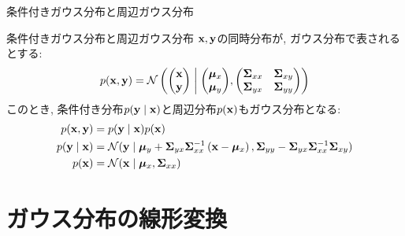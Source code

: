 \documentclass[dvipdfmx,notheorems,t]{beamer}
\begin{document}
\begin{frame}{条件付きガウス分布と周辺ガウス分布}
\begin{block}{条件付きガウス分布と周辺ガウス分布}
  $\vb{x}, \vb{y}$の同時分布が, ガウス分布で表されるとする:
  \begin{align*}
    p(\vb{x}, \vb{y}) = \mathcal{N} \left( \mqty(\vb{x} \\ \vb{y}) \middlerel|
      \mqty(\vb*{\mu}_x \\ \vb*{\mu}_y),
      \mqty(\vb{\Sigma}_{xx} & \vb{\Sigma}_{xy} \\
        \vb{\Sigma}_{yx} & \vb{\Sigma}_{yy}) \right)
  \end{align*}
  このとき, 条件付き分布$p(\vb{y} \mid \vb{x})$と周辺分布$p(\vb{x})$もガウス分布となる:
  \begin{align*}
    p(\vb{x}, \vb{y}) &= p(\vb{y} \mid \vb{x}) p(\vb{x}) \\
    p(\vb{y} \mid \vb{x}) &= \mathcal{N}(\vb{y} \mid \vb*{\mu}_y
      + \vb{\Sigma}_{yx} \vb{\Sigma}_{xx}^{-1} \left( \vb{x} - \vb*{\mu}_x \right),
      \vb{\Sigma}_{yy} - \vb{\Sigma}_{yx} \vb{\Sigma}_{xx}^{-1} \vb{\Sigma}_{xy}) \\
    p(\vb{x}) &= \mathcal{N}(\vb{x} \mid \vb*{\mu}_x, \vb{\Sigma}_{xx})
  \end{align*}
\end{block}
\end{frame}

\section{ガウス分布の線形変換}
\end{document}
